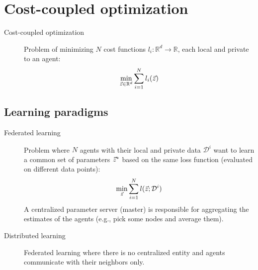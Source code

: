 \section{Cost-coupled optimization}


\begin{description}
    \item[Cost-coupled optimization] 
        Problem of minimizing $N$ cost functions $l_i: \mathbb{R}^d \rightarrow \mathbb{R}$, each local and private to an agent:
        \[
            \min_{{\vec{z}} \in \mathbb{R}^{d}} \sum_{i=1}^{N} l_i({\vec{z}})
        \]
\end{description}


\subsection{Learning paradigms}

\begin{description}
    \item[Federated learning] 
        Problem where $N$ agents with their local and private data $\mathcal{D}^{i}$ want to learn a common set of parameters ${\vec{z}}^*$ based on the same loss function (evaluated on different data points):
        \[
            \min_{\vec{z}} \sum_{i=1}^{N} l({\vec{z}}; \mathcal{D}^i)
        \]
        A centralized parameter server (master) is responsible for aggregating the estimates of the agents (e.g., pick some nodes and average them).

    \item[Distributed learning] 
        Federated learning where there is no centralized entity and agents communicate with their neighbors only.
\end{description}

